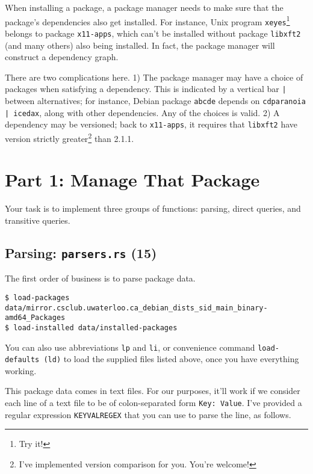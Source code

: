 \documentclass[12pt]{article}
\renewcommand{\_}{\kern-1.5pt\textunderscore\kern-1.5pt}
\begin{document}
\vspace{1em}
When installing a package, a package manager needs to make sure that the package's dependencies also get installed. For instance, Unix program \texttt{xeyes}\footnote{Try it!} belongs to package \texttt{x11-apps}, which can't be installed without package \texttt{libxft2} (and many others) also being installed. In fact, the package manager will construct a dependency graph. \par

\vspace{1em}
There are two complications here. 1) The package manager may have a choice of packages when satisfying a dependency. This is indicated by a vertical bar \texttt{|} between alternatives; for instance, Debian package \texttt{abcde} depends on \texttt{cdparanoia | icedax}, along with other dependencies. Any of the choices is valid. 2) A dependency may be versioned; back to \texttt{x11-apps}, it requires that \texttt{libxft2} have version strictly greater\footnote{I've implemented version comparison for you. You're welcome!} than 2.1.1.\par

\section*{Part 1: Manage That Package}

Your task is to implement three groups of functions: parsing, direct queries, and transitive queries.

\subsection*{Parsing: \texttt{parsers.rs} (15)}

The first order of business is to parse package data. 

{\small
\begin{verbatim}
$ load-packages data/mirror.csclub.uwaterloo.ca_debian_dists_sid_main_binary-amd64_Packages
$ load-installed data/installed-packages
\end{verbatim}
}

\vspace{1em}
You can also use abbreviations \texttt{lp} and \texttt{li}, or convenience command \texttt{load-defaults (ld)} 
to load the supplied files listed above, once you have everything working.\par

\vspace{1em}
This package data comes in text files. For our purposes, it'll work if we consider each line of a text file to be of colon-separated form \verb+Key: Value+. I've provided a regular expression \texttt{KEYVAL\_REGEX} that you can use to parse the line, as follows.\par
\end{document}
